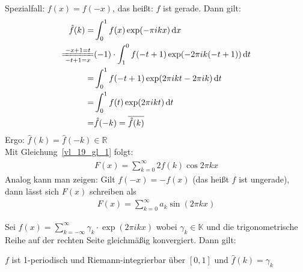 \begin{Bemerkung}
{\begin{itemize}
		Spezialfall: $f(x) = f(-x)$, das heißt: $f$ ist gerade. Dann gilt:
		\begin{align*}
			\hat{f}(k) = & \int_0^1 f(x) \exp(-\pi ikx) \dd{x} \\
			 \xlongequal[-t+1=x]{-x+1 = t} &(-1) \cdot \int_1^0 f(-t+1) 
			 	\exp(-2\pi ik (-t+1)) \dd{t} \\
			 = & \int_0^1 f(-t+1)\exp(2\pi i k t - 2\pi ik)  \dd{t} \\
			 = & \int_0^1 f(t) \exp(2\pi ikt) \dd{t} \\
			 = & \hat{f}(-k) = \overline{\hat{f}(k)}
		\end{align*}
		Ergo: $\hat{f}(k) = \hat{f}(-k) \in \mathbb{R}$ \\
		Mit Gleichung~\ref{vl_19_gl_1} folgt:
		\begin{align*}
			 F(x) = \sum_{k=0}^{\infty}  2 \hat{f}(k) \cos 2 \pi k x
		\end{align*}
		Analog kann man zeigen: Gilt $f(-x) = - f(x)$ 
		(das heißt $f$ ist ungerade), 
		dann lässt sich $F(x)$ schreiben als
		\begin{align*}
			F(x) = \sum_{k=0}^{\infty}a_k \sin(2\pi k x)
		\end{align*}		 
	\end{itemize}
}\end{Bemerkung}

\begin{Proposition}{%
	Sei $f(x) = \sum_{k = -\infty}^{\infty} \gamma_k \cdot \exp(2\pi i k x)$ wobei 
	$\gamma_k \in \mathbb{K}$ und die trigonometrische Reihe auf der rechten Seite 
	gleichmäßig konvergiert. Dann gilt:
	\begin{center}
		$f$ ist 1-periodisch und Riemann-integrierbar über $[0,1]$ und 
		$\hat{f}(k) = \gamma_k$
	\end{center}
}\end{Proposition}

